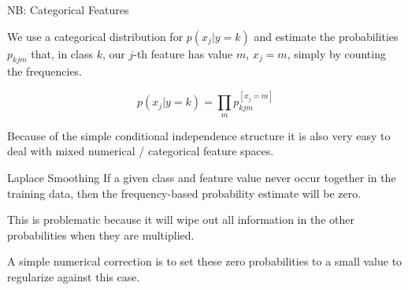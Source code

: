 \documentclass[11pt,compress,t,notes=noshow, xcolor=table]{beamer}
\begin{document}
\begin{vbframe}{NB: Categorical Features}

  We use a categorical distribution for $p(x_j | y = k)$ and estimate the probabilities $p_{kjm}$ that, in class $k$, our $j$-th feature has value $m$, $x_j = m$, simply by counting the frequencies.

$$
p(x_j | y = k) = \prod_m p_{kjm}^{[x_j = m]}
$$
%
%


Because of the simple conditional independence structure it is also very easy to deal with mixed numerical / categorical feature spaces.

\end{vbframe}






\begin{vbframe}{Laplace Smoothing}
If a given class and feature value never occur together in the training data, then the frequency-based probability estimate will be zero.

\lz

This is problematic because it will wipe out all information in the other probabilities when they are multiplied.

\lz
%
A simple numerical correction is to set these zero probabilities to a small value to regularize against this case.


\end{vbframe}


\end{document}
